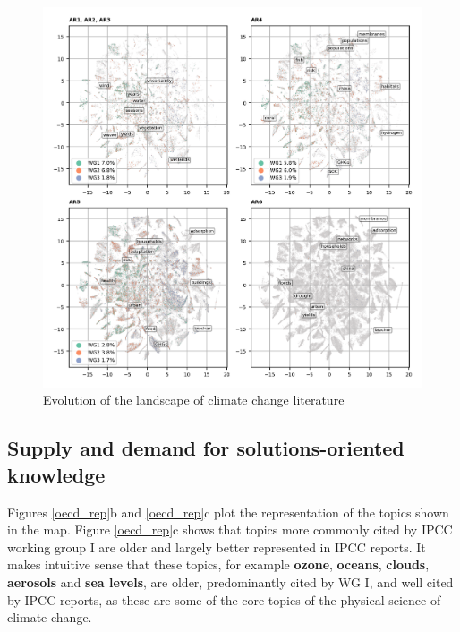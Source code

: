 \documentclass{article}
\begin{document}
\begin{linenumbers}


\begin{figure}
	\begin{center}
		\includegraphics[width=180mm]{plots_pub/topic_evolution_4.png}
		\caption{Evolution of the landscape of climate change literature}
		\label{evolution-map}
	\end{center}
\end{figure}

\subsection*{Supply and demand for solutions-oriented knowledge}

Figures \ref{oecd_rep}b and \ref{oecd_rep}c plot the representation of the topics shown in the map. Figure \ref{oecd_rep}c shows that topics more commonly cited by IPCC working group I are older and largely better represented in IPCC reports. It makes intuitive sense that these topics, for example \textbf{ozone}, \textbf{oceans}, \textbf{clouds}, \textbf{aerosols} and \textbf{sea levels}, are older, predominantly cited by WG I, and well cited by IPCC reports, as these are some of the core topics of the physical science of climate change.


\end{linenumbers}
\end{document}
